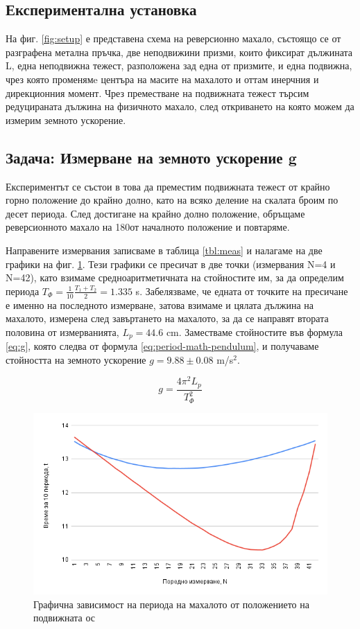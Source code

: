 \documentclass[12pt]{article}
\begin{document}
\subsection{Експериментална установка} 
На фиг. \ref{fig:setup} е представена схема на реверсионно махало, състоящо се от разграфена метална пръчка, две неподвижини призми, които фиксират дължината L, една неподвижна тежест, разположена зад една от призмите, и една подвижна, чрез която променямe центъра на масите на махалото и оттам инерчния и дирекционния момент. Чрез преместване на подвижната тежест търсим редуцираната дължина на физичното махало, след откриването на която можем да измерим земното ускорение.

\subsection{Задача: Измерване на земното ускорение g}
Експериментът се състои в това да преместим подвижната тежест от крайно горно положение до крайно долно, като на всяко деление на скалата броим по десет периода. След достигане на крайно долно положение, обръщаме реверсионното махало на 180\degree от началното положение и повтаряме.  

Направените измервания записваме в таблица \ref{tbl:meas} и налагаме на две графики на фиг. \ref{fig:results}. Тези графики се пресичат в две точки (измервания N=4 и N=42), като взимаме средноаритметичната на стойностите им, за да определим периода $T_\Phi = \frac{1}{10} \frac{T_1 + T_2}{2} = 1.335$ s. Забелязваме, че едната от точките на пресичане е именно на последното измерване, затова взимаме и цялата дължина на махалото, измерена след завъртането на махалото, за да се направят втората половина от измерванията, $L_p = 44.6$ cm. Заместваме стойностите във формула \ref{eq:g}, която следва от формула \ref{eq:period-math-pendulum}, и получаваме стойността на земното ускорение $g = 9.88 \pm 0.08$ m/s$^2$. 

\begin{equation}\label{eq:g}
    g = \frac{4\pi^2L_p}{T_\Phi^2}
\end{equation}

\begin{figure}
    \centering
    \includegraphics[width=1\textwidth]{images/chart.png}
    \caption{Графична зависимост на периода на махалото от положението на подвижната ос}
    \label{fig:results}
\end{figure}
\end{document}
